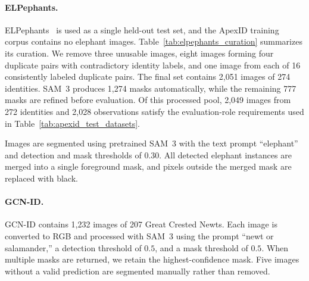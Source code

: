 \paragraph{ELPephants.}
ELPephants~\cite{korschens2019elpephants} is used as a single held-out test set,
and the ApexID training corpus contains no elephant images. Table~\ref{tab:elpephants_curation}
summarizes its curation. We remove three unusable images, eight images forming
four duplicate pairs with contradictory identity labels, and one image from
each of 16 consistently labeled duplicate pairs. The final set contains 2,051
images of 274 identities. SAM~3 produces 1,274 masks automatically, while the
remaining 777 masks are refined before evaluation. Of this processed pool,
2,049 images from 272 identities and 2,028 observations satisfy the
evaluation-role requirements used in Table~\ref{tab:apexid_test_datasets}.

Images are segmented using pretrained SAM~3 with the text prompt
``elephant'' and detection and mask thresholds of $0.30$. All detected elephant
instances are merged into a single foreground mask, and pixels outside the
merged mask are replaced with black.

\begin{table}[t]
\centering
\caption{Curation of the ELPephants external test set.}
\label{tab:elpephants_curation}
\end{table}

\paragraph{GCN-ID.}
GCN-ID contains 1,232 images of 207 Great Crested Newts. Each image is
converted to RGB and processed with SAM~3 using the prompt ``newt or
salamander,'' a detection threshold of $0.5$, and a mask threshold of $0.5$.
When multiple masks are returned, we retain the highest-confidence mask. Five
images without a valid prediction are segmented manually rather than removed.

